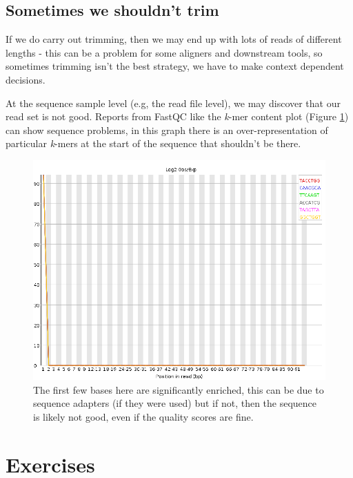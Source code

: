 \documentclass[12pt,]{book}
\begin{document}
\subsection{Sometimes we shouldn't
trim}\label{sometimes-we-shouldnt-trim}

If we do carry out trimming, then we may end up with lots of reads of
different lengths - this can be a problem for some aligners and
downstream tools, so sometimes trimming isn't the best strategy, we have
to make context dependent decisions.

At the sequence sample level (e.g, the read file level), we may discover
that our read set is not good. Reports from FastQC like the \emph{k}-mer
content plot (Figure \ref{fig:kmer}) can show sequence problems, in this
graph there is an over-representation of particular \emph{k}-mers at the
start of the sequence that shouldn't be there.





\begin{figure}
\includegraphics[width=5.33in]{assets/kmer_content} \caption{The first few bases here are significantly enriched, this
can be due to sequence adapters (if they were used) but if not, then the
sequence is likely not good, even if the quality scores are fine.}\label{fig:kmer}
\end{figure}

\section{Exercises}\label{exercises}
\end{document}
